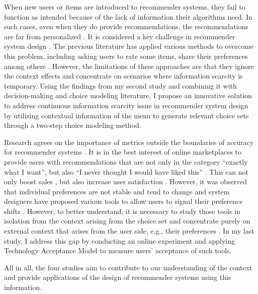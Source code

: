 \documentclass[a4paper,12pt]{article}
\begin{document}
When new users or items are introduced to recommender systems, they fail to function as intended because of the lack of information their algorithms need. In such cases, even when they do provide recommendations, the recommendations are far from personalized \citep{lika2014facing}. It is considered a key challenge in recommender system design \citep{park2009pairwise}. The previous literature has applied various methods to overcome this problem, including asking users to rate some items, share their preferences among others \citep{guy2009personalized, aharon2013off, bykau2013coping, saveski2014item}. However, the limitations of these approaches are that they ignore the context effects and concentrate on scenarios where information scarcity is temporary. Using the findings from my second study and combining it with decision-making and choice modeling literature, I propose an innovative solution to address continuous information scarcity issue in recommender system design by utilizing contextual information of the menu to generate relevant choice sets through a two-step choice modeling method.

Research agrees on the importance of metrics outside the boundaries of accuracy for recommender systems \citep{kaminskas2016diversity}. It is in the best interest of online marketplaces to provide users with recommendations that are not only in the category ``exactly what I want'', but also ``I never thought I would have liked this'' \citep{kotkovSurveySerendipityRecommender2016}. This can not only boost sales \citep{songWhenHowDiversify2019}, but also increase user satisfaction \citep{knijnenburgExplainingUserExperience2012}. However, it was observed that individual preferences are not stable and tend to change and system designers have proposed various tools to allow users to signal their preference shifts \citep{bostandjiev2012tasteweights,hijikata2012relation}. However, to better understand, it is necessary to study those tools in isolation from the context arising from the choice set and concentrate purely on external context that arises from the user side, e.g., their preferences \citep{adomavicius2011context}. In my last study, I address this gap by conducting an online experiment and applying Technology Acceptance Model \citep{davis1985technology} to measure users' acceptance of such tools.

All in all, the four studies aim to contribute to our understanding of the context and provide applications of the design of recommender systems using this information.
\end{document}
